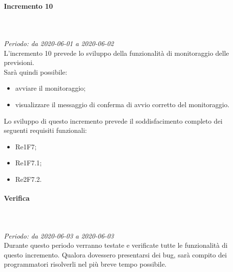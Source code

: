 \paragraph{Incremento 10}\mbox{} \\ \mbox{} \\ 
\textit{Periodo: da 2020-06-01 a 2020-06-02}\\
L’incremento 10 prevede lo sviluppo della funzionalità di monitoraggio delle previsioni. \\
Sarà quindi possibile:
\begin{itemize}
	\item avviare il monitoraggio;
	\item visualizzare il messaggio di conferma di avvio corretto del monitoraggio.
\end{itemize}
Lo sviluppo di questo incremento prevede il soddisfacimento completo dei seguenti requisiti funzionali:
\begin{itemize}
\item Re1F7;
\item Re1F7.1;
\item Re2F7.2.
\end{itemize}
\paragraph*{Verifica}\mbox{} \\ \mbox{} \\ 
\textit{Periodo: da 2020-06-03 a 2020-06-03}\\
Durante questo periodo verranno testate e verificate tutte le funzionalità di questo incremento. Qualora dovessero presentarsi dei bug, sarà compito dei programmatori risolverli nel più breve tempo possibile.

